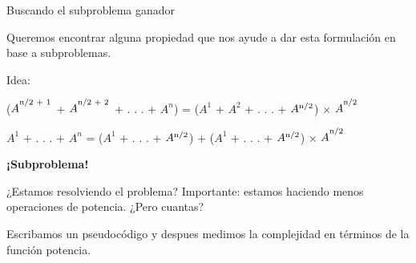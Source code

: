 \documentclass[pdf]{beamer}
\begin{document}
\begin{frame}{Buscando el subproblema ganador}
    \par{Queremos encontrar alguna propiedad que nos ayude a dar esta formulación en base a subproblemas.}
    \vspace{1em}
    
    \pause
    
    \par{Idea: }
    \vspace{1em}
    \par{($A^\textsuperscript{n/2 + 1}$ + $A^\textsuperscript{n/2 + 2}$ + . . . + $A^n$) = ($A^1$ + $A^2$ + . . . + $A\textsuperscript{n/2}$) $\times$ $A^\textsuperscript{n/2}$}   
    
    \pause
    \vspace{3em}
    
    \par{$A^1$ + . . . + $A^n$ = \alert<4>{($A^1$ + . . . + $A\textsuperscript{n/2}$)} + ($A^1$ + . . . + $A\textsuperscript{n/2}$) $\times$ $A^\textsuperscript{n/2}$}
    \pause
    \par{\textbf{¡Subproblema!}}
    
    
\end{frame}

\begin{frame}{¿Estamos resolviendo el problema?}
    Importante: estamos haciendo menos operaciones de potencia. ¿Pero cuantas?
    
    \pause
    \vspace{2em}
    Escribamos un pseudocódigo y despues medimos la complejidad en términos de la función potencia.
    
\end{frame}
\end{document}
